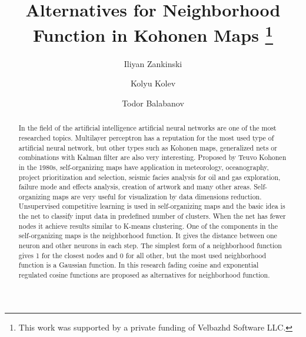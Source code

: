 \documentclass[runningheads]{llncs}
\begin{document}
\title{Alternatives for Neighborhood Function in Kohonen Maps \thanks{This work was supported by a private funding of Velbazhd Software LLC.}}

\author{Iliyan Zankinski \and
Kolyu Kolev \and
Todor Balabanov}


\maketitle

\begin{abstract}
In the field of the artificial intelligence artificial neural networks are one of the most researched topics. Multilayer perceptron has a reputation for the most used type of artificial neural network, but other types such as Kohonen maps, generalized nets\cite{tashev01} or combinations with Kalman filter\cite{alexandrov01} are also very interesting. Proposed by Teuvo Kohonen in the 1980s, self-organizing maps have application in meteorology, oceanography, project prioritization and selection, seismic facies analysis for oil and gas exploration, failure mode and effects analysis, creation of artwork and many other areas. Self-organizing maps are very useful for visualization by data dimensions reduction. Unsupervised competitive learning is used in self-organizing maps and the basic idea is the net to classify input data in predefined number of clusters. When the net has fewer nodes it achieve results similar to K-means clustering. One of the components in the self-organizing maps is the neighborhood function. It gives the distance between one neuron and other neurons in each step. The simplest form of a neighborhood function gives 1 for the closest nodes and 0 for all other, but the most used neighborhood function is a Gaussian function. In this research fading cosine and exponential regulated cosine functions are proposed as alternatives for neighborhood function.

\end{abstract}
\end{document}
